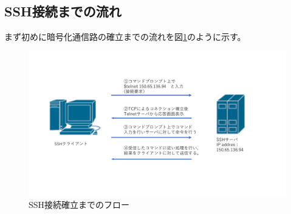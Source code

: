 \documentclass[11pt,a4j,titlepage]{jreport}
\begin{document}


\subsection{SSH接続までの流れ}

まず初めに暗号化通信路の確立までの流れを図\ref{SSH_flow}のように示す。
\begin{figure}[tbp]
    \centering
    \includegraphics[width=1.0\textwidth, page=5]{graphs/network_archtecture.pdf}
    \caption{SSH接続確立までのフロー}
    \label{SSH_flow}
\end{figure}

\end{document}
